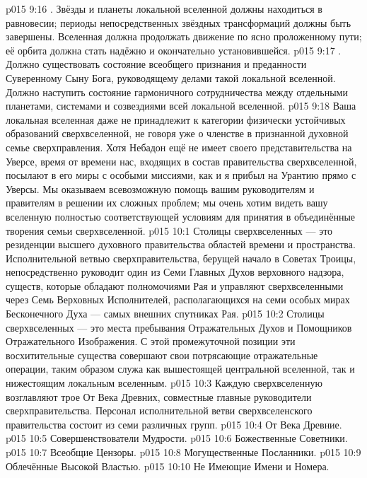 \vs p015 9:16 . Звёзды и планеты локальной вселенной должны находиться в равновесии; периоды непосредственных звёздных трансформаций должны быть завершены. Вселенная должна продолжать движение по ясно проложенному пути; её орбита должна стать надёжно и окончательно установившейся.
\vs p015 9:17 . Должно существовать состояние всеобщего признания и преданности Суверенному Сыну Бога, руководящему делами такой локальной вселенной. Должно наступить состояние гармоничного сотрудничества между отдельными планетами, системами и созвездиями всей локальной вселенной.
\vs p015 9:18 \pc Ваша локальная вселенная даже не принадлежит к категории физически устойчивых образований сверхвселенной, не говоря уже о членстве в признанной духовной семье сверхправления. Хотя Небадон ещё не имеет своего представительства на Уверсе, время от времени нас, входящих в состав правительства сверхвселенной, посылают в его миры с особыми миссиями, как и я прибыл на Урантию прямо с Уверсы. Мы оказываем всевозможную помощь вашим руководителям и правителям в решении их сложных проблем; мы очень хотим видеть вашу вселенную полностью соответствующей условиям для принятия в объединённые творения семьи сверхвселенной.
\vs p015 10:1 Столицы сверхвселенных --- это резиденции высшего духовного правительства областей времени и пространства. Исполнительной ветвью сверхправительства, берущей начало в Советах Троицы, непосредственно руководит один из Семи Главных Духов верховного надзора, существ, которые обладают полномочиями Рая и управляют сверхвселенными через Семь Верховных Исполнителей, располагающихся на семи особых мирах Бесконечного Духа --- самых внешних спутниках Рая.
\vs p015 10:2 Столицы сверхвселенных --- это места пребывания Отражательных Духов и Помощников Отражательного Изображения. С этой промежуточной позиции эти восхитительные существа совершают свои потрясающие отражательные операции, таким образом служа как вышестоящей центральной вселенной, так и нижестоящим локальным вселенным.
\vs p015 10:3 \pc Каждую сверхвселенную возглавляют трое От Века Древних, совместные главные руководители сверхправительства. Персонал исполнительной ветви сверхвселенского правительства состоит из семи различных групп.
\vs p015 10:4 От Века Древние.
\vs p015 10:5 Совершенствователи Мудрости.
\vs p015 10:6 Божественные Советники.
\vs p015 10:7 Всеобщие Цензоры.
\vs p015 10:8 Могущественные Посланники.
\vs p015 10:9 Облечённые Высокой Властью.
\vs p015 10:10 Не Имеющие Имени и Номера.

